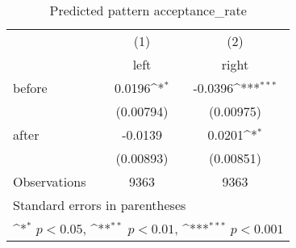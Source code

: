 \begin{table}[htbp]\centering
\def\sym#1{\ifmmode^{#1}\else\(^{#1}\)\fi}
\caption{Predicted pattern acceptance\_rate}
\begin{tabular}{l*{2}{c}}
\hline\hline
                    &\multicolumn{1}{c}{(1)}&\multicolumn{1}{c}{(2)}\\
                    &\multicolumn{1}{c}{left}&\multicolumn{1}{c}{right}\\
\hline
before              &      0.0196\sym{*}  &     -0.0396\sym{***}\\
                    &   (0.00794)         &   (0.00975)         \\
[1em]
after               &     -0.0139         &      0.0201\sym{*}  \\
                    &   (0.00893)         &   (0.00851)         \\
\hline
Observations        &        9363         &        9363         \\
\hline\hline
\multicolumn{3}{l}{\footnotesize Standard errors in parentheses}\\
\multicolumn{3}{l}{\footnotesize \sym{*} \(p<0.05\), \sym{**} \(p<0.01\), \sym{***} \(p<0.001\)}\\
\end{tabular}
\end{table}
